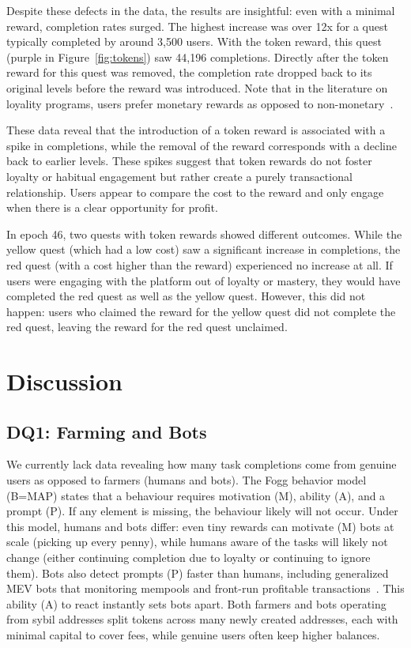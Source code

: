Despite these defects in the data, the results are insightful: even with a minimal reward, completion rates surged. The highest increase was over 12x for a quest typically completed by around 3,500 users. With the token reward, this quest (purple in Figure~\ref{fig:tokens}) saw 44,196 completions. Directly after the token reward for this quest was removed, the completion rate dropped back to its original levels before the reward was introduced. Note that in the literature on loyality programs, users prefer monetary rewards as opposed to non-monetary~\cite{RK17}.

These data reveal that the introduction of a token reward is associated with a spike in completions, while the removal of the reward corresponds with a decline back to earlier levels. These spikes suggest that token rewards do not foster loyalty or habitual engagement but rather create a purely transactional relationship. Users appear to compare the cost to the reward and only engage when there is a clear opportunity for profit.

In epoch 46, two quests with token rewards showed different outcomes. While the yellow quest (which had a low cost) saw a significant increase in completions, the red quest (with a cost higher than the reward) experienced no increase at all. If users were engaging with the platform out of loyalty or mastery, they would have completed the red quest as well as the yellow quest. However, this did not happen: users who claimed the reward for the yellow quest did not complete the red quest, leaving the reward for the red quest unclaimed.


\section{Discussion}


\subsection{DQ1: Farming and Bots } 

We currently lack data revealing how many task completions come from genuine users as opposed to farmers (humans and bots). The Fogg behavior model~\cite{Fogg09} (B=MAP) states that a behaviour requires motivation (M), ability (A), and a prompt (P). If any element is missing, the behaviour likely will not occur. Under this model, humans and bots differ: even tiny rewards can motivate (M) bots at scale (picking up every penny), while humans aware of the tasks will likely not change (either continuing completion due to loyalty or continuing to ignore them). Bots also detect prompts (P) faster than humans, including generalized MEV bots that  monitoring mempools and front-run profitable transactions~\cite{DGK+20}. This ability (A) to react instantly sets bots apart. Both farmers and bots operating from sybil addresses split tokens across many newly created addresses, each with minimal capital to cover fees, while genuine users often keep higher balances.

